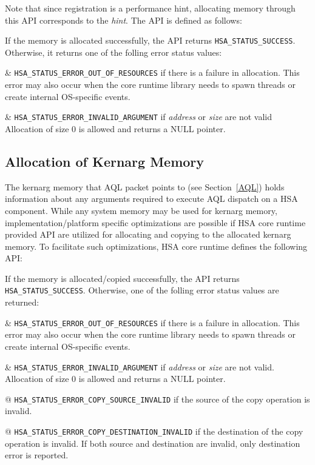 \documentclass{book}
\begin{document}
Note that since registration is a performance hint, allocating
memory through this API corresponds to the \emph{hint}. The API is
defined as follows:



If the memory is allocated successfully, the API returns
\texttt{HSA\_STATUS\_SUCCESS}. Otherwise, it returns one of the
folling error status values:

\begin{easylist}
& \texttt{HSA\_STATUS\_ERROR\_OUT\_OF\_RESOURCES} if there is a
failure in allocation. This error may also occur when the core
runtime library needs to spawn threads or create internal
OS-specific events.

& \texttt{HSA\_STATUS\_ERROR\_INVALID\_ARGUMENT} if {\itshape
address} or {\itshape size} are not valid Allocation of size 0 is
allowed and returns a NULL pointer.
\end{easylist}

\hypertarget{coreapi_kernarg}{}\subsection{Allocation of Kernarg
Memory}\label{kernargmem}

The kernarg memory that AQL packet points to (see Section~\ref{AQL})
holds information about any arguments required to execute AQL
dispatch on a HSA component. While any system memory may be used for
kernarg memory, implementation/platform specific optimizations are
possible if HSA core runtime provided API are utilized for
allocating and copying to the allocated kernarg memory. To
facilitate such optimizations, HSA core runtime defines the
following API:



If the memory is allocated/copied successfully, the API returns
\texttt{HSA\_STATUS\_SUCCESS}. Otherwise, one of the
folling error status values are returned:

\begin{easylist}
& \texttt{HSA\_STATUS\_ERROR\_OUT\_OF\_RESOURCES} if there is a
failure in allocation. This error may also occur when the core
runtime library needs to spawn threads or create internal
OS-specific events.

& \texttt{HSA\_STATUS\_ERROR\_INVALID\_ARGUMENT} if {\itshape
address} or {\itshape size} are not valid. Allocation of size 0 is
allowed and returns a NULL pointer.

@ \texttt{HSA\_STATUS\_ERROR\_COPY\_SOURCE\_INVALID} if the source
of the copy operation is invalid.

@ \texttt{HSA\_STATUS\_ERROR\_COPY\_DESTINATION\_INVALID} if the
destination of the copy operation is invalid. If both source and
destination are invalid, only destination error is reported.
\end{easylist}
\end{document}
